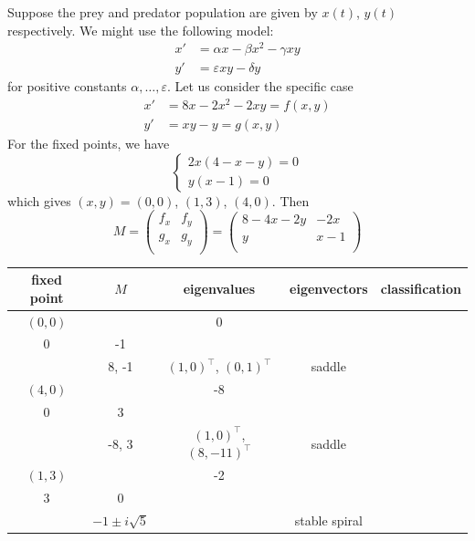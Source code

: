 \documentclass{../../template/note}
\begin{document}
    \begin{example}
        Suppose the prey and predator population are given by \(x(t)\), \(y(t)\) respectively. We might use the following model:
        \begin{align*}
            x' &= \alpha x - \beta x^2 - \gamma xy \\
            y' &= \varepsilon xy - \delta y
        \end{align*}
        for positive constants \(\alpha, \dots, \varepsilon\). Let us consider the specific case
        \begin{align*}
            x' &= 8x - 2x^2 - 2xy = f(x, y) \\
            y' &= xy - y = g(x, y)
        \end{align*}
        For the fixed points, we have
        \[
            \begin{cases}
                2x(4 - x - y) = 0 \\
                y(x-1) = 0
            \end{cases}
        \]
        which gives \((x, y) = (0, 0)\), \((1, 3)\), \((4, 0)\). Then
        \[
            M = \begin{pmatrix}
             f_x & f_y \\
             g_x & g_y \\
            \end{pmatrix} = \begin{pmatrix}
             8-4x-2y & -2x \\
             y & x-1 \\
            \end{pmatrix}
        \]
        \begin{center}
            \begin{tabular}{c | c | c | c | c}
                fixed point & \(M\) & eigenvalues & eigenvectors & classification \\
                \hline
                \((0, 0)\) & \(\begin{pmatrix}
                8 & 0 \\
                0 & -1 \\
                \end{pmatrix}\) & 8, -1 & \((1, 0)^\intercal\), \((0, 1)^\intercal\) & saddle \\
                \hline
                \((4, 0)\) & \(\begin{pmatrix}
                -8 & -8 \\
                0 & 3 \\
                \end{pmatrix}\) & -8, 3 & \((1, 0)^\intercal\), \((8, -11)^\intercal\) & saddle \\
                \hline
                \((1, 3)\) & \(\begin{pmatrix}
                -2 & -2 \\
                3 & 0 \\
                \end{pmatrix}\) & \(-1\pm i\sqrt 5\) & & stable spiral \\
            \end{tabular}
            

\end{center}
\end{example}
\end{document}
